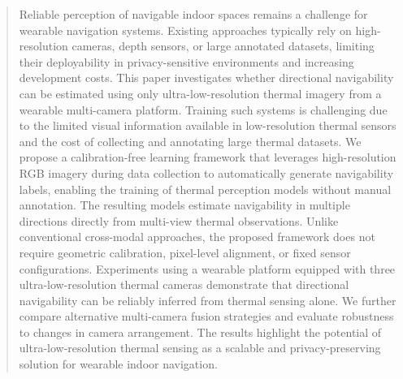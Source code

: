 \documentclass[conference,a4paper]{IEEEtran}
\begin{document}
\begin{abstract}
Reliable perception of navigable indoor spaces remains a challenge for wearable navigation systems. Existing approaches typically rely on high-resolution cameras, depth sensors, or large annotated datasets, limiting their deployability in privacy-sensitive environments and increasing development costs.
%
This paper investigates whether directional navigability can be estimated using only ultra-low-resolution thermal imagery from a wearable multi-camera platform. Training such systems is challenging due to the limited visual information available in low-resolution thermal sensors and the cost of collecting and annotating large thermal datasets.
%
We propose a calibration-free learning framework that leverages high-resolution RGB imagery during data collection to automatically generate navigability labels, enabling the training of thermal perception models without manual annotation. The resulting models estimate navigability in multiple directions directly from multi-view thermal observations. Unlike conventional cross-modal approaches, the proposed framework does not require geometric calibration, pixel-level alignment, or fixed sensor configurations.
%
Experiments using a wearable platform equipped with three ultra-low-resolution thermal cameras demonstrate that directional navigability can be reliably inferred from thermal sensing alone. We further compare alternative multi-camera fusion strategies and evaluate robustness to changes in camera arrangement. The results highlight the potential of ultra-low-resolution thermal sensing as a scalable and privacy-preserving solution for wearable indoor navigation.



\end{abstract}
\end{document}
